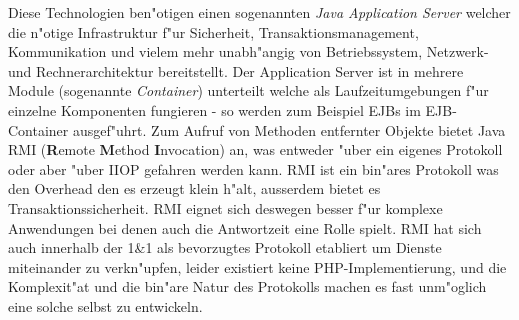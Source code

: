 Diese Technologien ben"otigen einen sogenannten \emph{Java Application Server} welcher die n"otige Infrastruktur
f"ur Sicherheit, Transaktionsmanagement, Kommunikation und vielem mehr unabh"angig von Betriebssystem, Netzwerk- und Rechnerarchitektur
bereitstellt. Der Application Server ist in mehrere Module (sogenannte \emph{Container}) unterteilt welche als Laufzeitumgebungen f"ur einzelne
Komponenten fungieren - so werden zum Beispiel EJBs im EJB-Container ausgef"uhrt. Zum Aufruf von Methoden entfernter Objekte bietet Java 
RMI (\textbf{R}emote \textbf{M}ethod \textbf{I}nvocation) an, was entweder "uber ein eigenes Protokoll oder aber "uber IIOP gefahren werden kann.
RMI ist ein bin"ares Protokoll was den Overhead den es erzeugt klein h"alt, ausserdem bietet es Transaktionssicherheit. RMI eignet sich deswegen besser f"ur 
komplexe Anwendungen bei denen auch die Antwortzeit eine Rolle spielt. RMI hat sich auch innerhalb der 1\&1 als bevorzugtes Protokoll 
etabliert um Dienste miteinander zu verkn"upfen, leider existiert keine PHP-Implementierung, und die Komplexit"at und die bin"are Natur des
Protokolls machen es fast unm"oglich eine solche selbst zu entwickeln.



